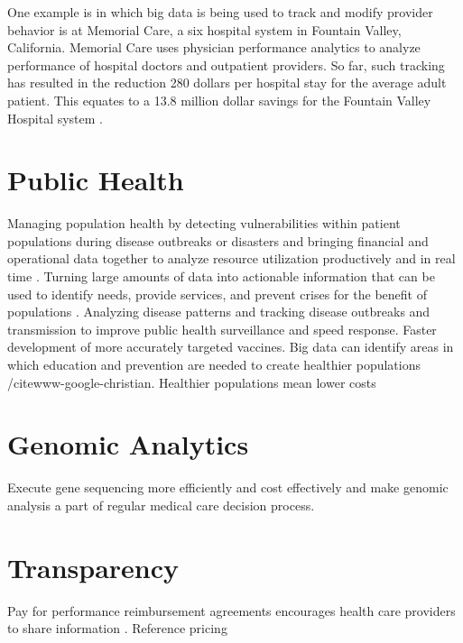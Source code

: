 \documentclass[sigconf]{acmart}
\begin{document}
One example is in which big data is being used to track and modify provider behavior is at Memorial Care, a six hospital system in Fountain Valley, California. Memorial Care uses physician performance analytics to analyze performance of hospital doctors and outpatient providers.  So far, such tracking has resulted in the reduction 280 dollars per hospital stay for the average adult patient. This equates to a 13.8 million dollar savings for the Fountain Valley Hospital system \cite{www-google-Datafloq}.
 

\section{Public Health}
Managing population health by detecting vulnerabilities within patient populations during disease outbreaks or disasters and bringing financial and operational data together to analyze resource utilization productively and in real time \cite{springer}.
Turning large amounts of data into actionable information that can be used to identify needs, provide services, and prevent crises for the benefit of populations \cite{springer}.
Analyzing disease patterns and tracking disease outbreaks and transmission to improve public health surveillance and speed response. Faster development of more accurately targeted vaccines.  
Big data can identify areas in which education and prevention are needed to create healthier populations /cite{www-google-christian}. Healthier populations mean lower costs
\section{Genomic Analytics}
Execute gene sequencing more efficiently and cost effectively and make genomic analysis a part of regular medical care decision process. 

\section{Transparency}
Pay for performance reimbursement agreements encourages health care providers to share information \cite{www-google-christian}.
Reference pricing
\end{document}

